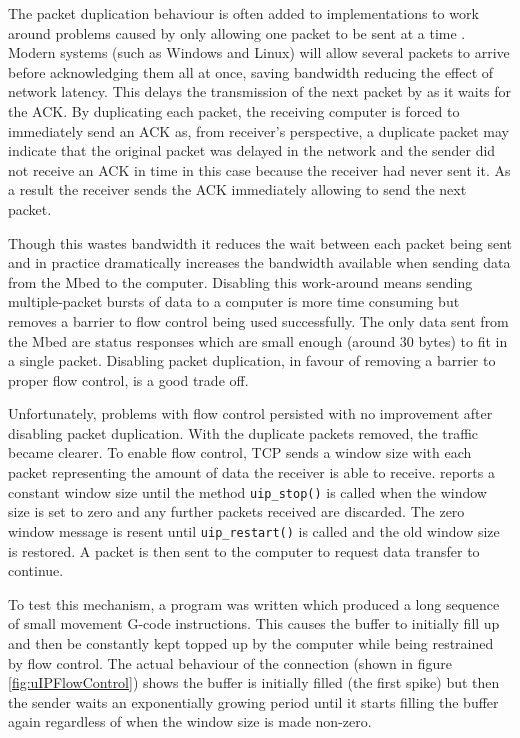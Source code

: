 		The packet duplication behaviour is often added to \uIP{} implementations to
		work around problems caused by \uIP{} only allowing one packet to be sent at
		a time \cite{allpacketsdup}. Modern systems (such as Windows and Linux) will
		allow several packets to arrive before acknowledging them all at once,
		saving bandwidth reducing the effect of network latency. This delays the
		transmission of the next packet by \uIP{} as it waits for the ACK. By
		duplicating each packet, the receiving computer is forced to immediately
		send an ACK as, from receiver's perspective, a duplicate packet may indicate
		that the original packet was delayed in the network and the sender did not
		receive an ACK in time in this case because the receiver had never sent it.
		As a result the receiver sends the ACK immediately allowing \uIP{} to send
		the next packet.
		
		Though this wastes bandwidth it reduces the wait between each packet being
		sent and in practice dramatically increases the bandwidth available when
		sending data from the Mbed to the computer. Disabling this work-around means
		sending multiple-packet bursts of data to a computer is more time consuming
		but removes a barrier to flow control being used successfully. The only data
		sent from the Mbed are status responses which are small enough (around 30
		bytes) to fit in a single packet. Disabling packet duplication, in favour of
		removing a barrier to proper flow control, is a good trade off.
		
		\label{sec:tcpProblem}
		
		Unfortunately, problems with flow control persisted with no improvement
		after disabling packet duplication. With the duplicate packets removed, the
		traffic became clearer. To enable flow control, TCP sends a window size with
		each packet representing the amount of data the receiver is able to receive.
		\uIP{} reports a constant window size until the method \verb|uip_stop()| is
		called when the window size is set to zero and any further packets received
		are discarded. The zero window message is resent until \verb|uip_restart()|
		is called and the old window size is restored. A packet is then sent to the
		computer to request data transfer to continue.
		
		To test this mechanism, a program was written which produced a long sequence
		of small movement G-code instructions. This causes the buffer to initially
		fill up and then be constantly kept topped up by the computer while being
		restrained by flow control. The actual behaviour of the connection (shown in
		figure \ref{fig:uIPFlowControl}) shows the buffer is initially filled (the
		first spike) but then the sender waits an exponentially growing period until
		it starts filling the buffer again regardless of when the window size is
		made non-zero.
		
